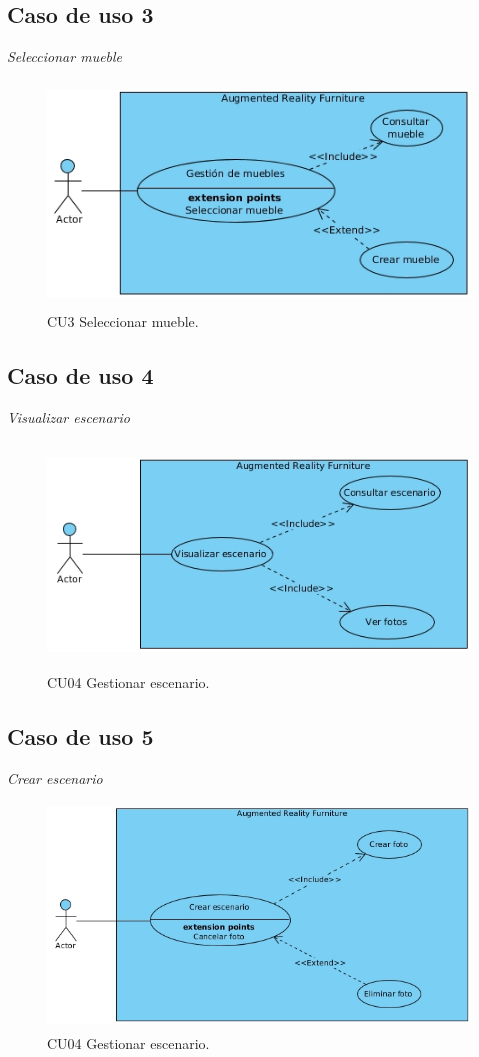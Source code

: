 \subsection{Caso de uso 3} \textit{Seleccionar mueble} 
\vspace{5mm}
\begin{figure}[h!]
	\centering
	\includegraphics[width=12cm,height=6cm]{imagenes/analisis/seleccionarMueble.jpg}
	\caption{CU3 Seleccionar mueble.}
	\label{fig:analogo}
\end{figure}

\subsection{Caso de uso 4}\textit{Visualizar escenario} 
\vspace{5mm}
\begin{figure}[h!]
	\centering
	\includegraphics[width=12cm,height=6cm]{imagenes/analisis/visualizarEscenario.jpg}
	\caption{CU04 Gestionar escenario.}
	\label{fig:analogo}
\end{figure}

\subsection{Caso de uso 5}\textit{Crear escenario} 
\vspace{5mm}
\begin{figure}[h!]
	\centering
	\includegraphics[width=12cm,height=6cm]{imagenes/analisis/crearEscenario.jpg}
	\caption{CU04 Gestionar escenario.}
	\label{fig:analogo}
\end{figure}